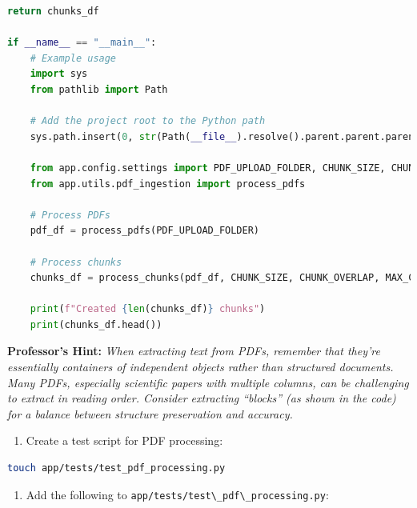 \documentclass[
  screen,review,acmlarge]{acmart}
\newcommand{\passthrough}[1]{#1}
\providecommand{\tightlist}{%
  \setlength{\itemsep}{0pt}\setlength{\parskip}{0pt}}
\begin{document}
\begin{lstlisting}[language=Python]
    return chunks_df

if __name__ == "__main__":
    # Example usage
    import sys
    from pathlib import Path
    
    # Add the project root to the Python path
    sys.path.insert(0, str(Path(__file__).resolve().parent.parent.parent))
    
    from app.config.settings import PDF_UPLOAD_FOLDER, CHUNK_SIZE, CHUNK_OVERLAP, MAX_CHUNKS_PER_DOC
    from app.utils.pdf_ingestion import process_pdfs
    
    # Process PDFs
    pdf_df = process_pdfs(PDF_UPLOAD_FOLDER)
    
    # Process chunks
    chunks_df = process_chunks(pdf_df, CHUNK_SIZE, CHUNK_OVERLAP, MAX_CHUNKS_PER_DOC)
    
    print(f"Created {len(chunks_df)} chunks")
    print(chunks_df.head())
\end{lstlisting}

\textbf{Professor's Hint:} \emph{When extracting text from PDFs, remember that they're essentially containers of independent objects rather than structured documents. Many PDFs, especially scientific papers with multiple columns, can be challenging to extract in reading order. Consider extracting ``blocks'' (as shown in the code) for a balance between structure preservation and accuracy.}

\begin{enumerate}
\def\labelenumi{\arabic{enumi}.}
\setcounter{enumi}{4}
\tightlist
\item
  Create a test script for PDF processing:
\end{enumerate}

\begin{lstlisting}[language=bash]
touch app/tests/test_pdf_processing.py
\end{lstlisting}

\begin{enumerate}
\def\labelenumi{\arabic{enumi}.}
\setcounter{enumi}{5}
\tightlist
\item
  Add the following to \passthrough{\lstinline!app/tests/test\_pdf\_processing.py!}:
\end{enumerate}
\end{document}
